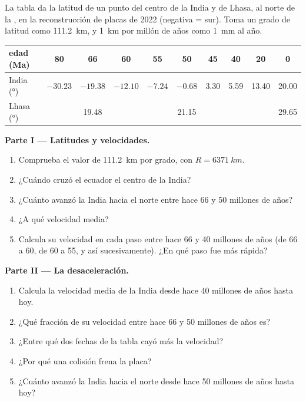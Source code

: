 \begin{problem}
\label{pb:g12:mountain-building:1}
La tabla da la latitud de un punto del centro de la India y de Lhasa, al
norte de la , en la reconstrucción de placas de 2022 (negativa = sur).
Toma un grado de latitud como \qty{111.2}{km}, y \qty{1}{km} por millón de
años como \qty{1}{mm} al año.

\begin{center}
\small
\begin{tabular}{|l|c|c|c|c|c|c|c|c|c|}
\hline
edad (\unit{Ma}) & 80 & 66 & 60 & 55 & 50 & 45 & 40 & 20 & 0 \\ \hline
India (\unit{\degree}) & $-30.23$ & $-19.38$ & $-12.10$ & $-7.24$ & $-0.68$ & 3.30 & 5.59 & 13.40 & 20.00 \\ \hline
Lhasa (\unit{\degree}) & & 19.48 & & & 21.15 & & & & 29.65 \\ \hline
\end{tabular}
\end{center}

\medskip
\noindent\textbf{Parte I --- Latitudes y velocidades.}
\begin{enumerate}
  \item Comprueba el valor de \qty{111.2}{km} por grado, con $R =
        \qty{6371}{km}$.
  \item ¿Cuándo cruzó el ecuador el centro de la India?
  \item ¿Cuánto avanzó la India hacia el norte entre hace 66 y 50 millones de años?
  \item ¿A qué velocidad media?
  \item Calcula su velocidad en cada paso entre hace 66 y 40 millones de años
        (de 66 a 60, de 60 a 55, y así sucesivamente). ¿En qué paso fue más rápida?
\end{enumerate}

\medskip
\noindent\textbf{Parte II --- La desaceleración.}
\begin{enumerate}[resume]
  \item Calcula la velocidad media de la India desde hace 40 millones de años hasta hoy.
  \item ¿Qué fracción de su velocidad entre hace 66 y 50 millones de años es?
  \item ¿Entre qué dos fechas de la tabla cayó más la velocidad?
  \item ¿Por qué una colisión frena la placa?
  \item ¿Cuánto avanzó la India hacia el norte desde hace 50 millones de años hasta hoy?
\end{enumerate}


\end{problem}
